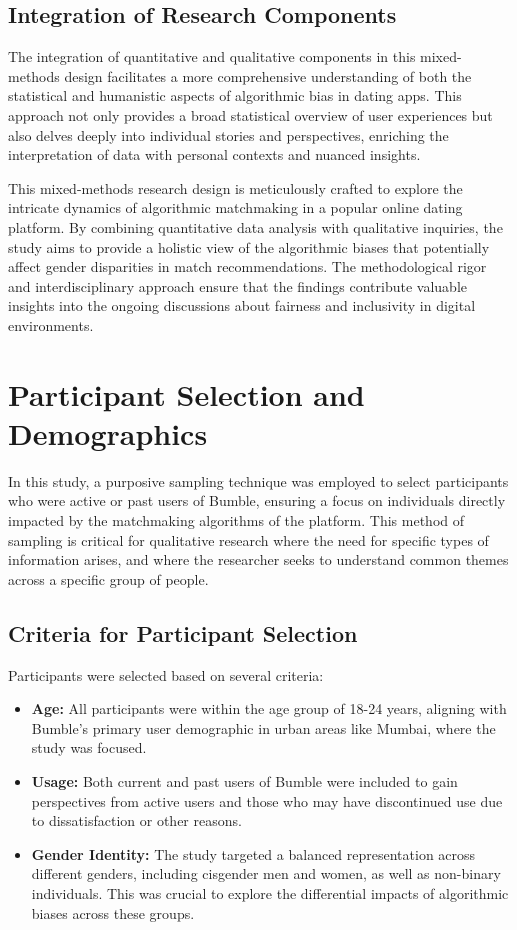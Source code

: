 \subsection{Integration of Research Components}
The integration of quantitative and qualitative components in this mixed-methods design facilitates a more comprehensive understanding of both the statistical and humanistic aspects of algorithmic bias in dating apps. This approach not only provides a broad statistical overview of user experiences but also delves deeply into individual stories and perspectives, enriching the interpretation of data with personal contexts and nuanced insights.


This mixed-methods research design is meticulously crafted to explore the intricate dynamics of algorithmic matchmaking in a popular online dating platform. By combining quantitative data analysis with qualitative inquiries, the study aims to provide a holistic view of the algorithmic biases that potentially affect gender disparities in match recommendations. The methodological rigor and interdisciplinary approach ensure that the findings contribute valuable insights into the ongoing discussions about fairness and inclusivity in digital environments.

\section{Participant Selection and Demographics}
In this study, a purposive sampling technique was employed to select participants who were active or past users of Bumble, ensuring a focus on individuals directly impacted by the matchmaking algorithms of the platform. This method of sampling is critical for qualitative research where the need for specific types of information arises, and where the researcher seeks to understand common themes across a specific group of people.

\subsection{Criteria for Participant Selection}
Participants were selected based on several criteria:

\begin{itemize}
    \item \textbf{Age:} All participants were within the age group of 18-24 years, aligning with Bumble’s primary user demographic in urban areas like Mumbai, where the study was focused.
    \item \textbf{Usage:} Both current and past users of Bumble were included to gain perspectives from active users and those who may have discontinued use due to dissatisfaction or other reasons.
    \item \textbf{Gender Identity:} The study targeted a balanced representation across different genders, including cisgender men and women, as well as non-binary individuals. This was crucial to explore the differential impacts of algorithmic biases across these groups.
\end{itemize}

